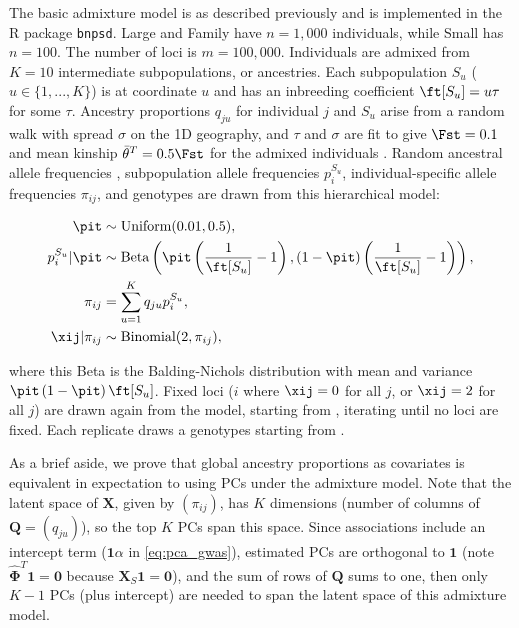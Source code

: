 \documentclass[11pt]{article}
\begin{document}
\begin{linenumbers}
The basic admixture model is as described previously \citep{ochoa_estimating_2021} and is implemented in the R package \texttt{bnpsd}.
Large and Family have $n = 1,000$ individuals, while Small has $n = 100$.
The number of loci is $m = 100,000$.
Individuals are admixed from $K = 10$ intermediate subpopulations, or ancestries.
Each subpopulation $S_u$ ($u \in \{ 1, ..., K \}$) is at coordinate $u$ and has an inbreeding coefficient $\ft[S_u] = u \tau$ for some $\tau$.
Ancestry proportions $q_{ju}$ for individual $j$ and $S_u$ arise from a random walk with spread $\sigma$ on the 1D geography, and $\tau$ and $\sigma$ are fit to give $\Fst = 0.1$ and mean kinship $\bar{\theta}^T = 0.5 \Fst$ for the admixed individuals \citep{ochoa_estimating_2021}.
Random ancestral allele frequencies \pit, subpopulation allele frequencies $p_i^{S_u}$, individual-specific allele frequencies $\pi_{ij}$, and genotypes \xij are drawn from this hierarchical model:
\begin{linenomath*}
\begin{align*}
  \pit
  &\sim
    \text{Uniform}( 0.01, 0.5 )
    , \\
  p_i^{S_u} | \pit
  &\sim
    \text{Beta} \left(
    \pit \left( \frac{1}{ \ft[S_u] } - 1 \right),
    \left( 1 - \pit \right) \left( \frac{1}{ \ft[S_u] } - 1 \right)
    \right)
    , \\
  \pi_{ij}
  &=
    \sum_{u = 1}^K q_{ju} p_i^{S_u}
    , \\
  \xij | \pi_{ij}
  &\sim
    \text{Binomial}(2, \pi_{ij})
    ,
\end{align*}
\end{linenomath*}
where this Beta is the Balding-Nichols distribution \citep{balding_method_1995} with mean \pit and variance $\pit \left( 1 - \pit \right) \ft[S_u]$.
Fixed loci ($i$ where $\xij = 0$ for all $j$, or $\xij = 2$ for all $j$) are drawn again from the model, starting from \pit, iterating until no loci are fixed.
Each replicate draws a genotypes starting from \pit.

As a brief aside, we prove that global ancestry proportions as covariates is equivalent in expectation to using PCs under the admixture model.
Note that the latent space of $\mathbf{X}$, given by $(\pi_{ij})$, has $K$ dimensions (number of columns of $\mathbf{Q} = (q_{ju})$), so the top $K$ PCs span this space.
Since associations include an intercept term ($\mathbf{1} \alpha$ in \cref{eq:pca_gwas}), estimated PCs are orthogonal to $\mathbf{1}$ (note $\mathbf{\hat{\Phi}}^T \mathbf{1} = \mathbf{0}$ because $\mathbf{X}_S \mathbf{1} = \mathbf{0}$), and the sum of rows of $\mathbf{Q}$ sums to one, then only $K-1$ PCs (plus intercept) are needed to span the latent space of this admixture model.


\end{linenumbers}
\end{document}
